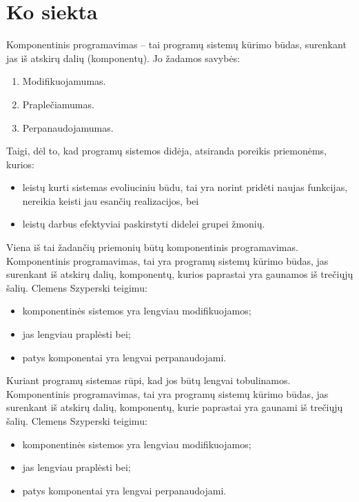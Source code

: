\section{Ko siekta}

\begin{frame}
  Komponentinis programavimas – tai programų sistemų kūrimo būdas,
  surenkant jas iš atskirų dalių (komponentų). Jo žadamos savybės:
  \begin{enumerate}
    \item Modifikuojamumas.
    \item Praplečiamumas.
    \item Perpanaudojamumas.
  \end{enumerate}
  \begin{handout}
    Taigi, dėl to, kad programų sistemos didėja, atsiranda poreikis
    priemonėms, kurios:
    \begin{itemize}
      \item leistų kurti sistemas evoliuciniu būdu, tai yra norint
        pridėti naujas funkcijas, nereikia keisti jau esančių
        realizacijos, bei
      \item leistų darbus efektyviai paskirstyti didelei grupei žmonių.
    \end{itemize}
    Viena iš tai žadančių priemonių būtų komponentinis programavimas.
    Komponentinis programavimas, tai yra programų sistemų kūrimo
    būdas, jas surenkant iš atskirų dalių, komponentų, kurios
    paprastai yra gaunamos iš trečiųjų šalių. Clemens Szyperski
    teigimu:
    \begin{itemize}
      \item komponentinės sistemos yra lengviau modifikuojamos;
      \item jas lengviau praplėsti bei;
      \item patys komponentai yra lengvai perpanaudojami.
    \end{itemize}
  \end{handout}

  \begin{handout}
    Kuriant programų sistemas rūpi, kad jos būtų lengvai tobulinamos.
    Komponentinis programavimas, tai yra programų sistemų kūrimo
    būdas, jas surenkant iš atskirų dalių, komponentų, kurie
    paprastai yra gaunami iš trečiųjų šalių. Clemens Szyperski
    teigimu:
    \begin{itemize}
      \item komponentinės sistemos yra lengviau modifikuojamos;
      \item jas lengviau praplėsti bei;
      \item patys komponentai yra lengvai perpanaudojami.
    \end{itemize}
  \end{handout}
\end{frame}

